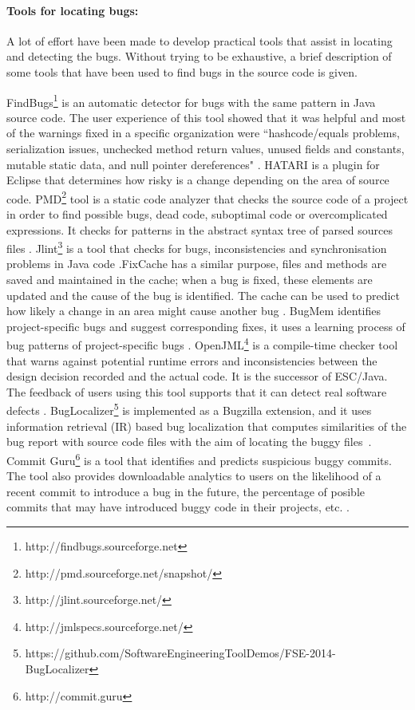 \documentclass[a4paper, 12pt]{book}
\begin{document}
\paragraph{Tools for locating bugs:}

A lot of effort have been made to develop practical tools that assist in locating and detecting the bugs. Without trying to be exhaustive, a brief description of some tools that have been used to find bugs in the source code is given.

FindBugs\footnote{http://findbugs.sourceforge.net} is an automatic detector for bugs with the same pattern in Java source code.  The user experience of this tool showed that it was helpful and most of the warnings fixed in a specific organization were ``hashcode/equals problems, serialization issues, unchecked method return values, unused fields and constants, mutable static data, and null pointer dereferences" \cite{hovemeyer2004finding}. HATARI is a plugin for Eclipse that determines how risky is a change depending on the area of source code\cite{sliwerski2005hatari}.   PMD\footnote{http://pmd.sourceforge.net/snapshot/} tool is a static code analyzer that checks the source code of a project in order to find possible bugs, dead code, suboptimal code or overcomplicated expressions. It checks for patterns in the abstract syntax tree of parsed sources files \cite{copeland2005pmd}. Jlint\footnote{http://jlint.sourceforge.net/} is a tool that checks for bugs, inconsistencies and synchronisation problems in Java code \cite{artho2001finding}.FixCache has a similar purpose, files and methods are saved and maintained in the cache; when a bug is fixed, these elements are updated and the cause of the bug is identified. The cache can be used to predict how likely a change in an area might cause another bug \cite{kim2007predicting}. BugMem identifies project-specific bugs and suggest corresponding fixes, it uses a learning process of bug patterns of project-specific bugs \cite{kim2006memories}.  OpenJML\footnote{http://jmlspecs.sourceforge.net/} is a compile-time checker tool that warns against potential runtime errors and inconsistencies between the design decision recorded and the actual code. It is the successor of ESC/Java. The feedback of users using this tool supports that it can detect real software defects \cite{flanagan2013pldi}. BugLocalizer\footnote{https://github.com/SoftwareEngineeringToolDemos/FSE-2014-BugLocalizer} is implemented as a Bugzilla extension, and it uses information retrieval (IR) based bug localization that computes similarities of the bug report with source code files with the aim of locating the buggy files~\cite{thung2014buglocalizer}. Commit Guru\footnote{http://commit.guru} is a tool that identifies and predicts suspicious buggy commits. The tool also provides downloadable analytics to users on the likelihood of a recent commit to introduce a bug in the future, the percentage of posible commits that may have introduced buggy code in their projects, etc. \cite{rosen2015commit}. 
\end{document}
